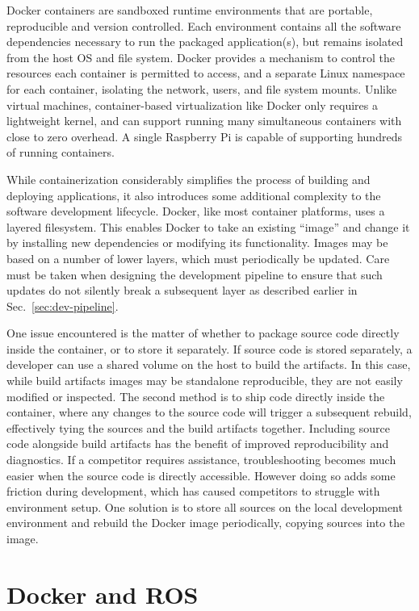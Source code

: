 \documentclass[12pt,initial,twoside,maitrise]{dms}
\numberwithin{equation}{section}
\numberwithin{table}{chapter}
\numberwithin{figure}{chapter}
\begin{document}
Docker containers are sandboxed runtime environments that are portable, reproducible and version controlled. Each environment contains all the software dependencies necessary to run the packaged application(s), but remains isolated from the host OS and file system. Docker provides a mechanism to control the resources each container is permitted to access, and a separate Linux namespace for each container, isolating the network, users, and file system mounts. Unlike virtual machines, container-based virtualization like Docker only requires a lightweight kernel, and can support running many simultaneous containers with close to zero overhead. A single Raspberry Pi is capable of supporting hundreds of running containers.

While containerization considerably simplifies the process of building and deploying applications, it also introduces some additional complexity to the software development lifecycle. Docker, like most container platforms, uses a layered filesystem. This enables Docker to take an existing ``image'' and change it by installing new dependencies or modifying its functionality. Images may be based on a number of lower layers, which must periodically be updated. Care must be taken when designing the development pipeline to ensure that such updates do not silently break a subsequent layer as described earlier in Sec.~\ref{sec:dev-pipeline}.

One issue encountered is the matter of whether to package source code directly inside the container, or to store it separately. If source code is stored separately, a developer can use a shared volume on the host to build the artifacts. In this case, while build artifacts images may be standalone reproducible, they are not easily modified or inspected. The second method is to ship code directly inside the container, where any changes to the source code will trigger a subsequent rebuild, effectively tying the sources and the build artifacts together. Including source code alongside build artifacts has the benefit of improved reproducibility and diagnostics. If a competitor requires assistance, troubleshooting becomes much easier when the source code is directly accessible. However doing so adds some friction during development, which has caused competitors to struggle with environment setup. One solution is to store all sources on the local development environment and rebuild the Docker image periodically, copying sources into the image.

\section{Docker and ROS}
\end{document}
